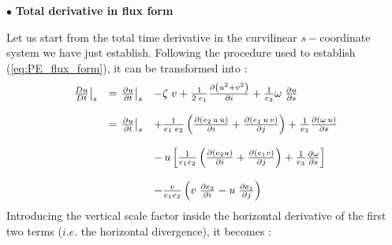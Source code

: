 \documentclass[../main/NEMO_manual]{subfiles}
\begin{document}
$\bullet$ \textbf{Total derivative in flux form}

Let us start from the total time derivative in the curvilinear $s-$coordinate system we have just establish.
Following the procedure used to establish (\autoref{eq:PE_flux_form}), it can be transformed into :
\begin{align*}
  {
  \begin{array}{*{20}l}
    \left. \frac{D u}{D t} \right|_s  &= \left. {\frac{\partial u }{\partial t}} \right|_s
    & -  \zeta \;v
      + \frac{1}{2\;e_1 } \frac{\partial \left( {u^2+v^2} \right)}{\partial i}
      + \frac{1}{e_3} \omega \;\frac{\partial u}{\partial s} \\ \\
                                      &= \left. {\frac{\partial u }{\partial t}} \right|_s
    &+\frac{1}{e_1\;e_2}  \left(    \frac{\partial \left( {e_2 \,u\,u } \right)}{\partial i}
      + \frac{\partial \left( {e_1 \,u\,v } \right)}{\partial j}     \right)
      + \frac{1}{e_3 } \frac{\partial \left( {\omega\,u} \right)}{\partial s} \\ \\
                                      &&- \,u \left[     \frac{1}{e_1 e_2 } \left(    \frac{\partial(e_2 u)}{\partial i}
                                         + \frac{\partial(e_1 v)}{\partial j}    \right)
                                         + \frac{1}{e_3}        \frac{\partial \omega}{\partial s}                       \right] \\ \\
                                      &&- \frac{v}{e_1 e_2 }\left(    v	\;\frac{\partial e_2 }{\partial i}
                                         -u	\;\frac{\partial e_1 }{\partial j} 	\right) \\
  \end{array}
  }
\end{align*}
%
Introducing the vertical scale factor inside the horizontal derivative of the first two terms 
($i.e.$ the horizontal divergence), it becomes :
\end{document}
